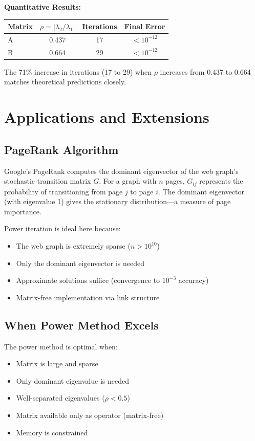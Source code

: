 \documentclass[11pt,twocolumn]{article}
\begin{document}
\textbf{Quantitative Results:}
\begin{center}
\begin{tabular}{lccc}
\toprule
Matrix & $\rho = |\lambda_2/\lambda_1|$ & Iterations & Final Error \\
\midrule
A & 0.437 & 17 & $< 10^{-12}$ \\
B & 0.664 & 29 & $< 10^{-12}$ \\
\bottomrule
\end{tabular}
\end{center}

The 71\% increase in iterations (17 to 29) when $\rho$ increases from 0.437 to 0.664 matches theoretical predictions closely.

\section{Applications and Extensions}

\subsection{PageRank Algorithm}

Google's PageRank computes the dominant eigenvector of the web graph's stochastic transition matrix $G$. For a graph with $n$ pages, $G_{ij}$ represents the probability of transitioning from page $j$ to page $i$. The dominant eigenvector (with eigenvalue 1) gives the stationary distribution---a measure of page importance.

Power iteration is ideal here because:
\begin{itemize}
\item The web graph is extremely sparse ($n > 10^{10}$)
\item Only the dominant eigenvector is needed
\item Approximate solutions suffice (convergence to $10^{-3}$ accuracy)
\item Matrix-free implementation via link structure
\end{itemize}

\subsection{When Power Method Excels}

The power method is optimal when:
\begin{itemize}
\item Matrix is large and sparse
\item Only dominant eigenvalue is needed
\item Well-separated eigenvalues ($\rho < 0.5$)
\item Matrix available only as operator (matrix-free)
\item Memory is constrained
\end{itemize}
\end{document}
